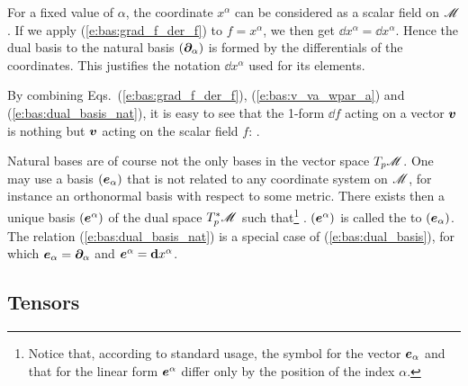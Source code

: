 \begin{remark}
For a fixed value of $\alpha$, the coordinate $x^\alpha$ can be considered as a scalar field on $\mathscr{M}$.
If we apply (\ref{e:bas:grad_f_der_f}) to $f=x^\alpha$, we then get $\dd x^\alpha = \dd x^\alpha$.
Hence the dual basis to the natural basis $(\bm{\partial}_\alpha)$ is formed by the
differentials of the coordinates. This justifies the notation $\dd x^\alpha$ used for its elements.
\end{remark}

By combining Eqs.~(\ref{e:bas:grad_f_der_f}), (\ref{e:bas:v_va_wpar_a}) and (\ref{e:bas:dual_basis_nat}), it is
easy to see that the 1-form $\dd f$ acting on a vector $\bm{v}$ is nothing but $\bm{v}$ acting on the scalar field
$f$:
\be \label{e:bas:df_v_eq_v_f}
    .
\ee

Natural bases are of course not the only bases in the vector
space $T_p\mathscr{M}$. One may use a basis $(\bm{e}_\alpha)$ that is not related to any coordinate system on $\mathscr{M}$, for instance an orthonormal basis with respect to some metric.
There exists then a unique basis $(\bm{e}^\alpha)$
of the dual space ${T_p^*\mathscr{M}}$ such that\footnote{Notice that,
according to standard usage, the symbol for the vector $\bm{e}_\alpha$ and that for the linear form $\bm{e}^\alpha$ differ only by the position of the index $\alpha$.}
\be \label{e:bas:dual_basis}
   .
\ee
$(\bm{e}^\alpha)$ is called the  to
$(\bm{e}_\alpha)$.
The relation (\ref{e:bas:dual_basis_nat}) is a special case
of (\ref{e:bas:dual_basis}), for which $\bm{e}_\alpha = \bm{\partial}_\alpha$ and $\bm{e}^\alpha = \mathbf{d} x^\alpha$.


\subsection{Tensors} \label{s:bas:tensors}

